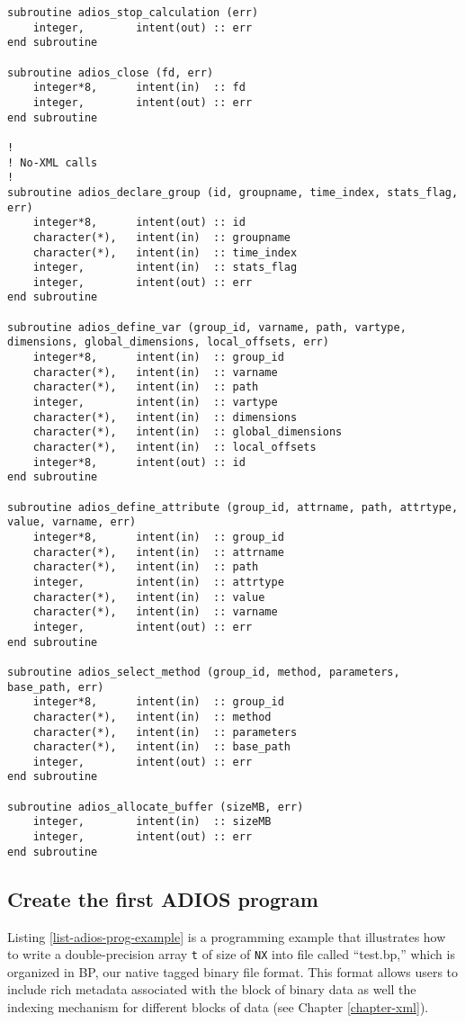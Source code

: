 \begin{lstlisting}[language=ADIOS,alsolanguage=Fortran]
subroutine adios_stop_calculation (err)
    integer,        intent(out) :: err
end subroutine

subroutine adios_close (fd, err)
    integer*8,      intent(in)  :: fd
    integer,        intent(out) :: err
end subroutine

!
! No-XML calls
!
subroutine adios_declare_group (id, groupname, time_index, stats_flag, err)
    integer*8,      intent(out) :: id
    character(*),   intent(in)  :: groupname
    character(*),   intent(in)  :: time_index
    integer,        intent(in)  :: stats_flag
    integer,        intent(out) :: err
end subroutine

subroutine adios_define_var (group_id, varname, path, vartype, dimensions, global_dimensions, local_offsets, err)
    integer*8,      intent(in)  :: group_id
    character(*),   intent(in)  :: varname
    character(*),   intent(in)  :: path
    integer,        intent(in)  :: vartype
    character(*),   intent(in)  :: dimensions
    character(*),   intent(in)  :: global_dimensions
    character(*),   intent(in)  :: local_offsets
    integer*8,      intent(out) :: id
end subroutine

subroutine adios_define_attribute (group_id, attrname, path, attrtype, value, varname, err)
    integer*8,      intent(in)  :: group_id
    character(*),   intent(in)  :: attrname
    character(*),   intent(in)  :: path
    integer,        intent(in)  :: attrtype
    character(*),   intent(in)  :: value
    character(*),   intent(in)  :: varname
    integer,        intent(out) :: err
end subroutine

subroutine adios_select_method (group_id, method, parameters, base_path, err)
    integer*8,      intent(in)  :: group_id
    character(*),   intent(in)  :: method
    character(*),   intent(in)  :: parameters
    character(*),   intent(in)  :: base_path
    integer,        intent(out) :: err
end subroutine

subroutine adios_allocate_buffer (sizeMB, err)
    integer,        intent(in)  :: sizeMB
    integer,        intent(out) :: err
end subroutine
\end{lstlisting}

\subsection{Create the first ADIOS program}

Listing \ref{list-adios-prog-example} is a programming example that illustrates 
how to write a double-precision 
array \verb+t+ of size of \verb+NX+ into file called ``test.bp,'' 
which is organized in BP, our native tagged binary file format. This format allows 
users to include rich metadata associated with the block of binary data as well 
the indexing mechanism for different blocks of data (see Chapter \ref{chapter-xml}). 

